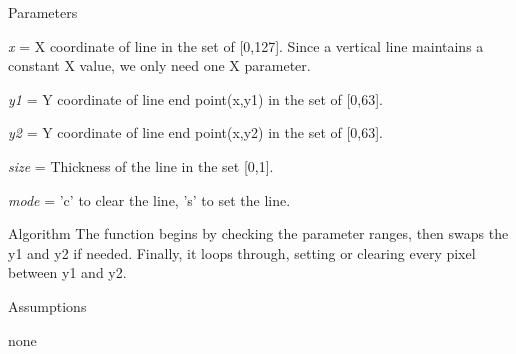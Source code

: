 \begin{DoxyParagraph}{Parameters}

\begin{DoxyItemize}
\item {\itshape x} = X coordinate of line in the set of \mbox{[}0,127\mbox{]}. Since a vertical line maintains a constant X value, we only need one X parameter.
\item {\itshape y1} = Y coordinate of line end point(x,y1) in the set of \mbox{[}0,63\mbox{]}.
\item {\itshape y2} = Y coordinate of line end point(x,y2) in the set of \mbox{[}0,63\mbox{]}.
\item {\itshape size} = Thickness of the line in the set \mbox{[}0,1\mbox{]}.
\item {\itshape mode} = 'c' to clear the line, 's' to set the line.
\end{DoxyItemize}
\end{DoxyParagraph}
\begin{DoxyParagraph}{Algorithm}
The function begins by checking the parameter ranges, then swaps the y1 and y2 if needed. Finally, it loops through, setting or clearing every pixel between y1 and y2.
\end{DoxyParagraph}
\begin{DoxyParagraph}{Assumptions}

\begin{DoxyItemize}
\item none 
\end{DoxyItemize}
\end{DoxyParagraph}
